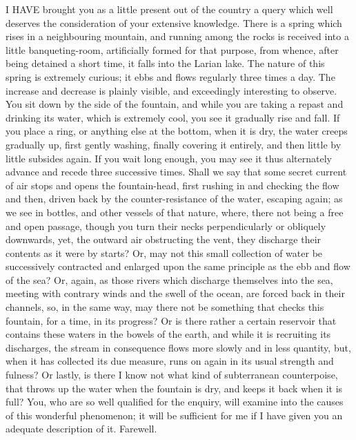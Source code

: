 
I HAVE brought you as a little present out of the country a query which
well deserves the consideration of your extensive knowledge. There is a
spring which rises in a neighbouring mountain, and running among the rocks
is received into a little banqueting-room, artificially formed for that
purpose, from whence, after being detained a short time, it falls into the
Larian lake. The nature of this spring is extremely curious; it ebbs and
flows regularly three times a day. The increase and decrease is plainly
visible, and exceedingly interesting to observe. You sit down by the side
of the fountain, and while you are taking a repast and drinking its water,
which is extremely cool, you see it gradually rise and fall. If you place
a ring, or anything else at the bottom, when it is dry, the water creeps
gradually up, first gently washing, finally covering it entirely, and then
little by little subsides again. If you wait long enough, you may see it
thus alternately advance and recede three successive times. Shall we say
that some secret current of air stops and opens the fountain-head, first
rushing in and checking the flow and then, driven back by the
counter-resistance of the water, escaping again; as we see in bottles, and
other vessels of that nature, where, there not being a free and open
passage, though you turn their necks perpendicularly or obliquely
downwards, yet, the outward air obstructing the vent, they discharge their
contents as it were by starts? Or, may not this small collection of water
be successively contracted and enlarged upon the same principle as the ebb
and flow of the sea? Or, again, as those rivers which discharge themselves
into the sea, meeting with contrary winds and the swell of the ocean, are
forced back in their channels, so, in the same way, may there not be
something that checks this fountain, for a time, in its progress? Or is
there rather a certain reservoir that contains these waters in the bowels
of the earth, and while it is recruiting its discharges, the stream in
consequence flows more slowly and in less quantity, but, when it has
collected its due measure, runs on again in its usual strength and
fulness? Or lastly, is there I know not what kind of subterranean
counterpoise, that throws up the water when the fountain is dry, and keeps
it back when it is full? You, who are so well qualified for the enquiry,
will examine into the causes of this wonderful phenomenon; it will be
sufficient for me if I have given you an adequate description of it.
Farewell.

